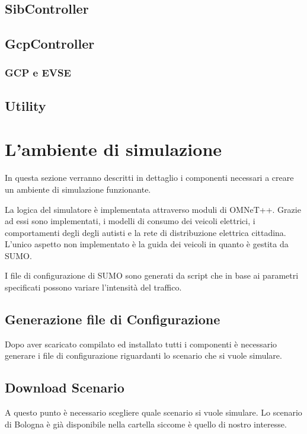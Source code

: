 \subsection{SibController}

\subsection{GcpController}

\subsubsection{GCP e EVSE}

\subsection{Utility}

\section{L'ambiente di simulazione}

In questa sezione verranno descritti in dettaglio i componenti necessari a creare un ambiente di simulazione funzionante.

La logica del simulatore è implementata attraverso moduli di OMNeT++. Grazie ad essi sono implementati, i modelli di consumo dei veicoli elettrici, i comportamenti degli degli autisti e la rete di distribuzione elettrica cittadina. L'unico aspetto non implementato è la guida dei veicoli in quanto è gestita da SUMO.

I file di configurazione di SUMO sono generati da script che in base ai parametri specificati possono variare l'intensità del traffico.


\subsection{Generazione file di Configurazione}

Dopo aver scaricato compilato ed installato tutti i componenti è necessario generare i file di configurazione riguardanti lo scenario che si vuole simulare. 

\subsection{Download Scenario}

A questo punto è necessario scegliere quale scenario si vuole simulare. Lo scenario di Bologna è già disponibile nella cartella  siccome è quello di nostro interesse.

